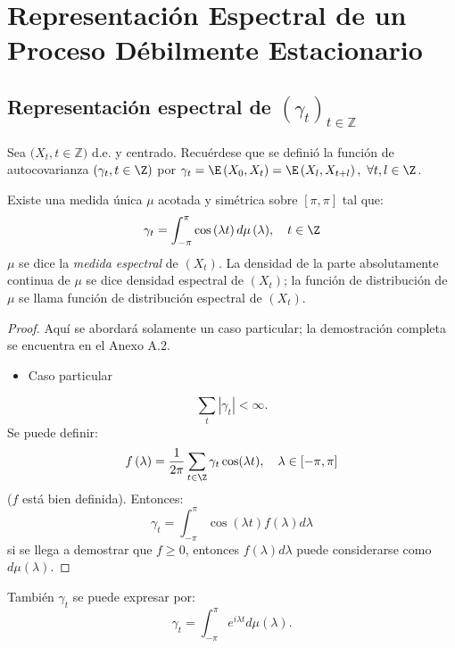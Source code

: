 \section{Representaci\'{o}n Espectral de un Proceso D\'{e}bilmente Estacionario}
\subsection{Representaci\'{o}n espectral de $( \gamma_{t} )_{t\in \mathbb{Z}}$ }

Sea $(X_{t}, t\in \mathbb{Z)}$ d.e. y centrado. Recu\'{e}rdese que se defini\'{o} la funci\'{o}n de autocovarianza $\left( \gamma_{t}, t\in 
\Z \right)$ por $\gamma_{t}=\E\left( X_{0},X_{t} \right)=\E\left( X_{l},X_{t+l} \right),\ \forall t, l\in \Z$. 

\begin{teorema}
Existe una medida \'{u}nica $\mu $ acotada y sim\'{e}trica sobre $\left[ \pi ,\pi \right]$ tal que:
\[
\gamma_{t}=\int_{-\pi }^\pi {\cos \left( \lambda t \right)d\mu 
\left( \lambda \right)},\quad t\in \Z
\]
$\mu $ se dice la \emph{medida espectral} de $\left( X_{t} \right)$. La densidad de la parte 
absolutamente continua de $\mu $ se dice densidad espectral de $\left( X_{t} \right)$; la funci\'{o}n de distribuci\'{o}n de $\mu $ se llama funci\'{o}n de distribuci\'{o}n espectral de $\left( X_{t} \right)$.
 
\end{teorema}

\begin{proof}
Aqu\'{i} se abordar\'{a} solamente un caso particular; la demostraci\'{o}n completa se encuentra en el Anexo A.2.
\begin{itemize}
      \item Caso particular
\end{itemize}

\[
\sum_t \left| \gamma_{t} \right| <\infty .
\]
Se puede definir:
\[
f\left( \lambda \right)=\frac{1}{2\pi }\sum_{t\in \Z} {\gamma 
_{t}\cos(\lambda t)} ,\quad \lambda \in 
\left[ -\pi ,\pi \right]
\]
($f$ est\'{a} bien definida). Entonces: 
\[
\gamma_{t}=\int_{-\pi }^\pi {\cos \left( \lambda t \right)f(\lambda 
)d\lambda } 
\]
si se llega a demostrar que $f\ge 0$, entonces $f(\lambda )d\lambda $ puede considerarse como $d\mu (\lambda )$.
\end{proof}

\begin{observacion}
Tambi\'{e}n $\gamma_{t}$ se puede expresar por: 
\[
\gamma_{t}=\int_{-\pi }^\pi {e^{i\lambda t}d\mu \left( \lambda 
\right)} .
\]
\end{observacion}

